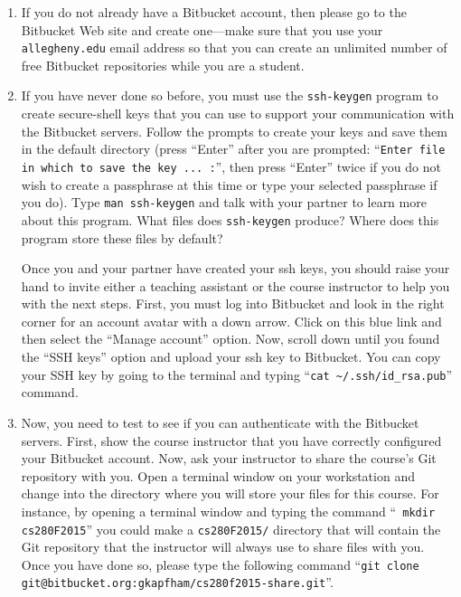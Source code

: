 \begin{enumerate}

  \item If you do not already have a Bitbucket account, then please go to the Bitbucket Web site and create one---make sure
    that you use your {\tt allegheny.edu} email address so that you can create an unlimited number of free Bitbucket
    repositories while you are a student.

  \item If you have never done so before, you must use the {\tt ssh-keygen} program to create secure-shell keys that you
    can use to support your communication with the Bitbucket servers. Follow the prompts to create your keys and save
    them in the default directory (press ``Enter'' after you are prompted: ``{\tt Enter file in which to save the key ...
    :}'', then press ``Enter'' twice if you do not wish to create a passphrase at this time or type your selected
    passphrase if you do).   Type {\tt man ssh-keygen} and talk with your partner to learn more about this program.
    What files does {\tt ssh-keygen} produce?  Where does this program store these files by default?

    Once you and your partner have created your ssh keys, you should raise your hand to invite either a teaching
    assistant or the course instructor to help you with the next steps. First, you must log into Bitbucket and look in the
    right corner for an account avatar with a down arrow.  Click on this blue link and then select the ``Manage
    account'' option. Now, scroll down until you found the ``SSH keys'' option and upload your ssh key to Bitbucket. You
    can copy your SSH key by going to the terminal and typing ``{\tt cat \textasciitilde{}/.ssh/id\_rsa.pub}'' command.

  \item Now, you need to test to see if you can authenticate with the Bitbucket servers.  First, show the course
    instructor that you have correctly configured your Bitbucket account.  Now, ask your instructor to share the
    course's Git repository with you.  Open a terminal window on your workstation and change into the directory where
    you will store your files for this course.  For instance, by opening a terminal window and typing the command ``{\tt
    mkdir cs280F2015}'' you could make a {\tt cs280F2015/} directory that will contain the Git repository that the
    instructor will always use to share files with you.  Once you have done so, please type the following command
    ``{\tt git clone git@bitbucket.org:gkapfham/cs280f2015-share.git}''.


\end{enumerate}
